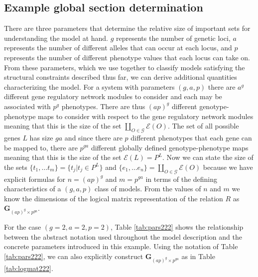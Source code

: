 \subsection*{Example global section determination}
There are three parameters that determine the relative size of important sets for understanding the model at hand. $g$ represents the number of genetic loci, $a$ represents the number of different alleles that can occur at each locus, and $p$ represents the number of different phenotype values that each locus can take on. From these parameters, which we use together to classify models satisfying the structural constraints described thus far, we can derive additional quantities characterizing the model. For a system with parameters $(g,a,p)$ there are $a^g$ different gene regulatory network modules to consider and each may be associated with $p^g$ phenotypes. There are thus $(ap)^g$ different genotype-phenotype maps to consider with respect to the gene regulatory network modules meaning that this is the size of the set $\coprod_{O \in \mathcal{G}} \mathcal{E}(O)$. The set of all possible genes $L$ has size $ga$ and since there are $p$ different phenotypes that each gene can be mapped to, there are $p^{ga}$ different globally defined genotype-phenotype maps meaning that this is the size of the set $\mathcal{E}(L) = P^L$. Now we can state the size of the sets $\{t_1, \ldots t_m\} = \{t_j | t_j \in P^L\}$ and $\{e_1, \ldots e_n\} = \coprod_{O \in \mathcal{G}} \mathcal{E}(O)$ because we have explicit formulas for $n = (ap)^g$ and $m = p^{ga}$ in terms of the defining characteristics of a $(g,a,p)$ class of models. From the values of $n$ and $m$ we know the dimensions of the logical matrix representation of the relation $R$ as $\mathbf{G}_{(ap)^g \times p^{ga}}$.

For the case $(g=2,a=2,p=2)$, Table \ref{tab:pars222} shows the relationship between the abstract notation used throughout the model description and the concrete parameters introduced in this example. Using the notation of Table \ref{tab:pars222}, we can also explicitly construct $\mathbf{G}_{(ap)^g \times p^{ga}}$ as in Table \ref{tab:logmat222}.


